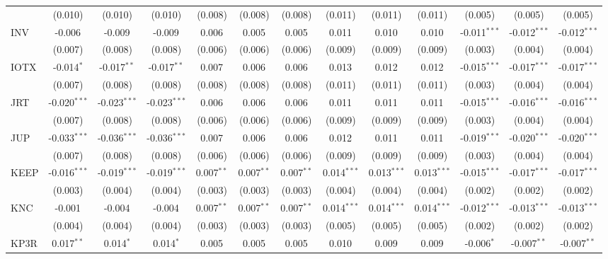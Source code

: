 \begin{table}[!htbp]
\begin{tabular}{@{\extracolsep{5pt}}lcccccccccccc}
  & (0.010) & (0.010) & (0.010) & (0.008) & (0.008) & (0.008) & (0.011) & (0.011) & (0.011) & (0.005) & (0.005) & (0.005) \\
 INV & -0.006$^{}$ & -0.009$^{}$ & -0.009$^{}$ & 0.006$^{}$ & 0.005$^{}$ & 0.005$^{}$ & 0.011$^{}$ & 0.010$^{}$ & 0.010$^{}$ & -0.011$^{***}$ & -0.012$^{***}$ & -0.012$^{***}$ \\
  & (0.007) & (0.008) & (0.008) & (0.006) & (0.006) & (0.006) & (0.009) & (0.009) & (0.009) & (0.003) & (0.004) & (0.004) \\
 IOTX & -0.014$^{*}$ & -0.017$^{**}$ & -0.017$^{**}$ & 0.007$^{}$ & 0.006$^{}$ & 0.006$^{}$ & 0.013$^{}$ & 0.012$^{}$ & 0.012$^{}$ & -0.015$^{***}$ & -0.017$^{***}$ & -0.017$^{***}$ \\
  & (0.007) & (0.008) & (0.008) & (0.008) & (0.008) & (0.008) & (0.011) & (0.011) & (0.011) & (0.003) & (0.004) & (0.004) \\
 JRT & -0.020$^{***}$ & -0.023$^{***}$ & -0.023$^{***}$ & 0.006$^{}$ & 0.006$^{}$ & 0.006$^{}$ & 0.011$^{}$ & 0.011$^{}$ & 0.011$^{}$ & -0.015$^{***}$ & -0.016$^{***}$ & -0.016$^{***}$ \\
  & (0.007) & (0.008) & (0.008) & (0.006) & (0.006) & (0.006) & (0.009) & (0.009) & (0.009) & (0.003) & (0.004) & (0.004) \\
 JUP & -0.033$^{***}$ & -0.036$^{***}$ & -0.036$^{***}$ & 0.007$^{}$ & 0.006$^{}$ & 0.006$^{}$ & 0.012$^{}$ & 0.011$^{}$ & 0.011$^{}$ & -0.019$^{***}$ & -0.020$^{***}$ & -0.020$^{***}$ \\
  & (0.007) & (0.008) & (0.008) & (0.006) & (0.006) & (0.006) & (0.009) & (0.009) & (0.009) & (0.003) & (0.004) & (0.004) \\
 KEEP & -0.016$^{***}$ & -0.019$^{***}$ & -0.019$^{***}$ & 0.007$^{**}$ & 0.007$^{**}$ & 0.007$^{**}$ & 0.014$^{***}$ & 0.013$^{***}$ & 0.013$^{***}$ & -0.015$^{***}$ & -0.017$^{***}$ & -0.017$^{***}$ \\
  & (0.003) & (0.004) & (0.004) & (0.003) & (0.003) & (0.003) & (0.004) & (0.004) & (0.004) & (0.002) & (0.002) & (0.002) \\
 KNC & -0.001$^{}$ & -0.004$^{}$ & -0.004$^{}$ & 0.007$^{**}$ & 0.007$^{**}$ & 0.007$^{**}$ & 0.014$^{***}$ & 0.014$^{***}$ & 0.014$^{***}$ & -0.012$^{***}$ & -0.013$^{***}$ & -0.013$^{***}$ \\
  & (0.004) & (0.004) & (0.004) & (0.003) & (0.003) & (0.003) & (0.005) & (0.005) & (0.005) & (0.002) & (0.002) & (0.002) \\
 KP3R & 0.017$^{**}$ & 0.014$^{*}$ & 0.014$^{*}$ & 0.005$^{}$ & 0.005$^{}$ & 0.005$^{}$ & 0.010$^{}$ & 0.009$^{}$ & 0.009$^{}$ & -0.006$^{*}$ & -0.007$^{**}$ & -0.007$^{**}$ \\

\end{tabular}
\end{table}
